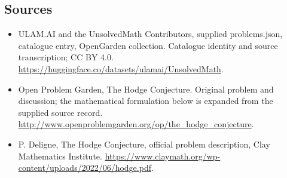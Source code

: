 \documentclass[11pt,a4paper]{article}
\begin{document}
\subsection{Sources}
\begin{itemize}
\item[S1] ULAM.AI and the UnsolvedMath Contributors, supplied problems.json, catalogue entry, OpenGarden collection. Catalogue identity and source transcription; CC BY 4.0.
\url{https://huggingface.co/datasets/ulamai/UnsolvedMath}.
\item[S2] Open Problem Garden, The Hodge Conjecture. Original problem and discussion; the mathematical formulation below is expanded from the supplied source record.
\url{http://www.openproblemgarden.org/op/the_hodge_conjecture}.
\item[S3] P. Deligne, The Hodge Conjecture, official problem description, Clay Mathematics Institute.
\url{https://www.claymath.org/wp-content/uploads/2022/06/hodge.pdf}.
\end{itemize}
\end{document}
